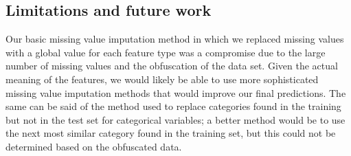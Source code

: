 \documentclass{article}\usepackage[]{graphicx}\usepackage[]{color}
\begin{document}
                                                                                                                                                                                                                                                                                                                                                                                                                                                                                                                                                                                                \subsection{Limitations and future work}
                                                                                                                                                                                                                                                                                                                                                                                                                                                                                                                                                                                                Our basic missing value imputation method in which we replaced missing values with a global value for each feature type was a compromise due to the large number of missing values and the obfuscation of the data set. Given the actual meaning of the features, we would likely be able to use more sophisticated missing value imputation methods that would improve our final predictions. The same can be said of the method used to replace categories found in the training but not in the test set for categorical variables; a better method would be to use the next most similar category found in the training set, but this could not be determined based on the obfuscated data.
                                                                                                                                                                                                                                                                                                                                                                                                                                                                                                                                                                                                
\end{document}

